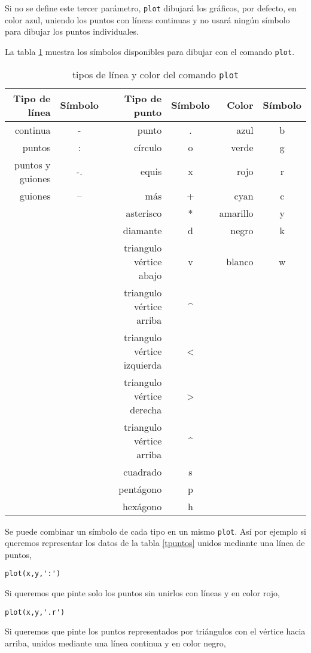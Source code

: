 Si no se define este tercer parámetro, \texttt{plot} dibujará los gráficos, por defecto, en color azul, uniendo los puntos con líneas continuas y no usará ningún símbolo para dibujar los puntos individuales.
 
La tabla \ref{tcolor} muestra los símbolos disponibles para dibujar con el comando \texttt{plot}.

\begin{table}[h]
\caption{tipos de línea y color del comando \texttt{plot}}
\centering
\begin{tabular}{rc|rc|rc}
Tipo de línea&Símbolo&Tipo de punto& Símbolo &Color&Símbolo\\ 
\hline
continua&-&punto&.&azul&b\\
puntos&:&círculo&o&verde&g\\
puntos y guiones&-.&equis&x&rojo&r\\
guiones&--&más&+&cyan&c\\
&&asterisco&*&amarillo&y\\
&&diamante&d&negro&k\\
&&triangulo vértice abajo&v&blanco&w\\
&&triangulo vértice arriba&\^{}&&\\
&&triangulo vértice izquierda&\textless&&\\
&&triangulo vértice derecha&\textgreater&&\\
&&triangulo vértice arriba&\^{}&&\\
&&cuadrado&s&&\\
&&pentágono&p&&\\
&&hexágono&h&\\
\hline
\end{tabular}
\label{tcolor}
\end{table} 

Se puede combinar un símbolo de cada tipo en un mismo \texttt{plot}. Así por ejemplo si queremos representar los datos de la tabla \ref{tpuntos} unidos mediante una línea de puntos,
\begin{verbatim}
plot(x,y,':')
\end{verbatim} 

Si queremos que pinte solo los puntos sin unirlos con líneas y en color rojo,
\begin{verbatim}
plot(x,y,'.r')
\end{verbatim}

Si queremos que pinte los puntos representados por triángulos con el vértice hacia arriba, unidos mediante una línea continua y en color negro,

